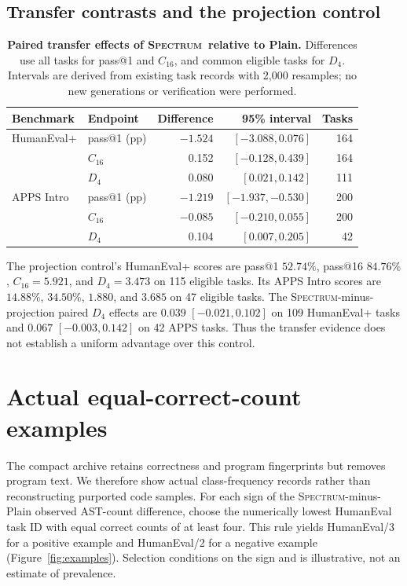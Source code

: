 \documentclass{article}
\newcommand{\method}{\textsc{Spectrum}}
\begin{document}
\subsection{Transfer contrasts and the projection control}
\begin{table}[htbp]
\centering\small
\caption{\textbf{Paired transfer effects of \method\ relative to Plain.} Differences use all tasks for pass@1 and $C_{16}$, and common eligible tasks for $D_4$. Intervals are derived from existing task records with 2,000 resamples; no new generations or verification were performed.}
\begin{tabular}{llrrr}
\toprule
Benchmark & Endpoint & Difference & 95\% interval & Tasks\\
\midrule
HumanEval+ & pass@1 (pp)&$-1.524$&$[-3.088,0.076]$&164\\
 & $C_{16}$&0.152&$[-0.128,0.439]$&164\\
 & $D_4$&0.080&$[0.021,0.142]$&111\\
APPS Intro & pass@1 (pp)&$-1.219$&$[-1.937,-0.530]$&200\\
 & $C_{16}$&$-0.085$&$[-0.210,0.055]$&200\\
 & $D_4$&0.104&$[0.007,0.205]$&42\\
\bottomrule
\end{tabular}
\end{table}
The projection control's HumanEval+ scores are pass@1 $52.74\%$, pass@16 $84.76\%$, $C_{16}=5.921$, and $D_4=3.473$ on 115 eligible tasks. Its APPS Intro scores are $14.88\%$, $34.50\%$, $1.880$, and $3.685$ on 47 eligible tasks. The \method-minus-projection paired $D_4$ effects are $0.039$ $[-0.021,0.102]$ on 109 HumanEval+ tasks and $0.067$ $[-0.003,0.142]$ on 42 APPS tasks. Thus the transfer evidence does not establish a uniform advantage over this control.

\FloatBarrier
\section{Actual equal-correct-count examples}
\label{app:cases}
The compact archive retains correctness and program fingerprints but removes program text. We therefore show actual class-frequency records rather than reconstructing purported code samples. For each sign of the \method-minus-Plain observed AST-count difference, choose the numerically lowest HumanEval task ID with equal correct counts of at least four. This rule yields HumanEval/3 for a positive example and HumanEval/2 for a negative example (Figure~\ref{fig:examples}). Selection conditions on the sign and is illustrative, not an estimate of prevalence.
\end{document}
